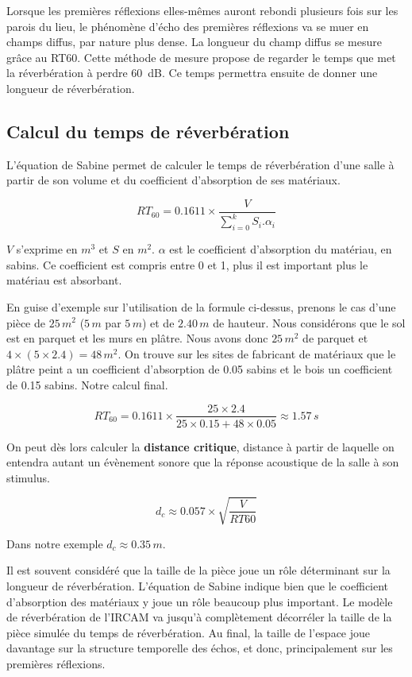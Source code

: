 \documentclass[
]{book}
\begin{document}
Lorsque les premières réflexions elles-mêmes auront rebondi plusieurs fois sur les parois du lieu, le phénomène d'écho des premières réflexions va se muer en champs diffus, par nature plus dense. La longueur du champ diffus se mesure grâce au RT60. Cette méthode de mesure propose de regarder le temps que met la réverbération à perdre 60~dB. Ce temps permettra ensuite de donner une longueur de réverbération.

\hypertarget{calcul-du-temps-de-ruxe9verbuxe9ration}{%
\subsection{Calcul du temps de réverbération}\label{calcul-du-temps-de-ruxe9verbuxe9ration}}

L'équation de Sabine permet de calculer le temps de réverbération d'une salle à partir de son volume et du coefficient d'absorption de ses matériaux.

\[RT_{60} = 0.1611 \times \frac{V}{\sum_{i=0}^{k} S_i.\alpha_i}\]

\(V\) s'exprime en \(m^3\) et \(S\) en \(m^2\). \(\alpha\) est le coefficient d'absorption du matériau, en sabins. Ce coefficient est compris entre 0 et 1, plus il est important plus le matériau est absorbant.

En guise d'exemple sur l'utilisation de la formule ci-dessus, prenons le cas d'une pièce de \(25\,m^2\) (\(5\,m\) par \(5\,m\)) et de \(2.40\,m\) de hauteur. Nous considérons que le sol est en parquet et les murs en plâtre. Nous avons donc \(25\,m^2\) de parquet et \(4\times(5\times2.4)=48\,m^2\). On trouve sur les sites de fabricant de matériaux que le plâtre peint a un coefficient d'absorption de 0.05 sabins et le bois un coefficient de 0.15 sabins. Notre calcul final.

\[RT_{60} = 0.1611 \times \frac{25 \times 2.4}{25\times0.15+48\times0.05} \approx 1.57\,s\]

On peut dès lors calculer la \textbf{distance critique}, distance à partir de laquelle on entendra autant un évènement sonore que la réponse acoustique de la salle à son stimulus.

\[d_c \approx 0.057 \times \sqrt{\frac{V}{RT60}}\]

Dans notre exemple \(d_c \approx 0.35\,m\).

Il est souvent considéré que la taille de la pièce joue un rôle déterminant sur la longueur de réverbération. L'équation de Sabine indique bien que le coefficient d'absorption des matériaux y joue un rôle beaucoup plus important. Le modèle de réverbération de l'IRCAM va jusqu'à complètement décorréler la taille de la pièce simulée du temps de réverbération. Au final, la taille de l'espace joue davantage sur la structure temporelle des échos, et donc, principalement sur les premières réflexions.
\end{document}
